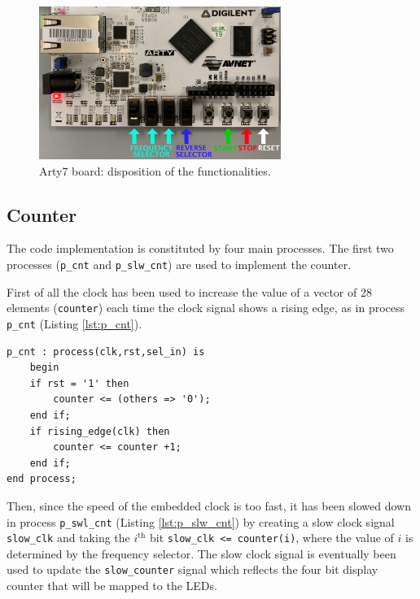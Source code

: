 \documentclass[11pt, a4paper]{article}
\begin{document}
\begin{figure}[H]
\centering
\includegraphics[width=0.7\textwidth]{../main/image/board_implementation.pdf}
\caption{\label{fig:board_implementation} Arty7 board: disposition of the functionalities.}
\end{figure}


\clearpage
\subsection{Counter}
The code implementation is constituted by four main processes. The first two processes ({\footnotesize\texttt{p\_cnt}} and {\footnotesize\texttt{p\_slw\_cnt}}) are used to implement the counter.

First of all the clock has been used to increase the value of a vector of 28 elements ({\footnotesize\texttt{counter}}) each time the clock signal shows a rising edge, as in process {\footnotesize\texttt{p\_cnt}} (Listing \ref{lst:p_cnt}).

\begin{lstlisting}[style=vhdl,label={lst:p_cnt},caption={\texttt{p\_cnt} process.}]
p_cnt : process(clk,rst,sel_in) is
    begin
    if rst = '1' then
        counter <= (others => '0');
    end if;
    if rising_edge(clk) then
        counter <= counter +1;
    end if;
end process;\end{lstlisting}

Then, since the speed of the embedded clock is too fast, it has been slowed down in process {\footnotesize\texttt{p\_swl\_cnt}} (Listing \ref{lst:p_slw_cnt}) by creating a slow clock signal {\footnotesize\texttt{slow\_clk}} and taking the \(i^\text{th}\) bit {\footnotesize\texttt{slow\_clk <= counter(i)}}, where the value of \(i\) is determined by the frequency selector.
The slow clock signal is eventually been used to update the {\footnotesize\texttt{slow\_counter}} signal which reflects the four bit display counter that will be mapped to the LEDs.
\end{document}
